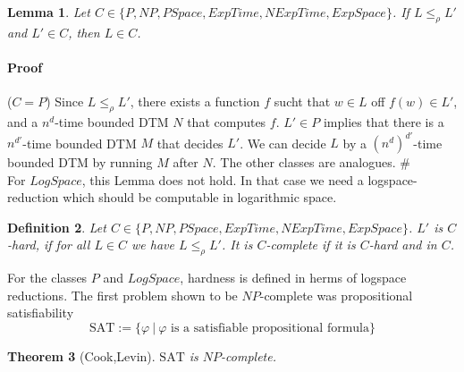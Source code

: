 \documentclass{report}
\newtheorem{definition}{Definition}[chapter]
\newtheorem{theorem}[definition]{Theorem}
\newtheorem{lemma}[definition]{Lemma}
\begin{document}
\begin{lemma} Let $C \in \{P,NP,PSpace,ExpTime,NExpTime,ExpSpace\}$. If $L\leq_\rho L'$ and $L'\in C$, then $L \in C$.
\end{lemma}
\paragraph{Proof} ($C=P$) Since $L\leq_\rho L'$, there exists a function $f$ sucht that $w\in L$ off $f(w)\in L'$, and a $n^d$-time bounded DTM $N$ that computes $f$. $L'\in P$ implies that there is a $n^{d'}$-time bounded DTM $M$ that decides $L'$. We can decide $L$ by a $(n^d)^{d'}$-time bounded DTM by running $M$ after $N$. The other classes are analogues. $\#$\\

For $LogSpace$, this Lemma does not hold. In that case we need a logspace-reduction which should be computable in logarithmic space.

\begin{definition}Let $C\in\{P,NP,PSpace,ExpTime,NExpTime,ExpSpace\}$. $L'$ is $C$-hard, if for all $L\in C$ we have $L\leq_\rho L'$. It is $C$-complete if it is $C$-hard and in $C$.
\end{definition}
For the classes $P$ and $LogSpace$, hardness is defined in herms of logspace reductions. The first problem shown to be $NP$-complete was propositional satisfiability
\[ \mathrm{SAT} := \{\varphi\ |\ \varphi \text{ is a satisfiable propositional formula}\} \]

\begin{theorem}[Cook,Levin] $\mathrm{SAT}$ is $NP$-complete.
\end{theorem}
\end{document}
